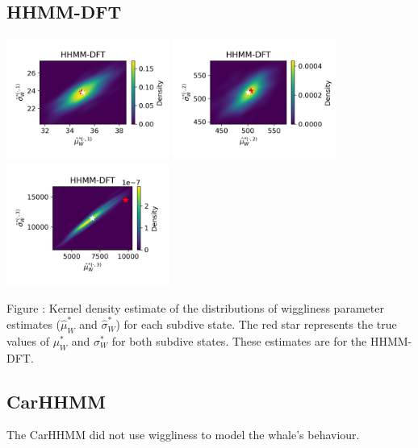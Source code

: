 \documentclass{article}
\begin{document}
        \subsection{HHMM-DFT}
        \begin{center}
        \includegraphics[width=2.1in]{../Plots/hhmm_FV_uncorr_MLE_density_FoVeDBA_0_0.png}
        \includegraphics[width=2.1in]{../Plots/hhmm_FV_uncorr_MLE_density_FoVeDBA_0_1.png}
        \includegraphics[width=2.1in]{../Plots/hhmm_FV_uncorr_MLE_density_FoVeDBA_0_2.png}
        \end{center}
        
        \noindent Figure : Kernel density estimate of the distributions of wiggliness parameter estimates ($\hat \mu^*_W$ and $\hat \sigma^*_W$) for each subdive state. The red star represents the true values of $\mu^*_W$ and $\sigma^*_W$ for both subdive states. These estimates are for the HHMM-DFT.
        \addtocounter{fignum}{1}
        
        \subsection{CarHHMM}
        The CarHHMM did not use wiggliness to model the whale's behaviour.
        
\end{document}
